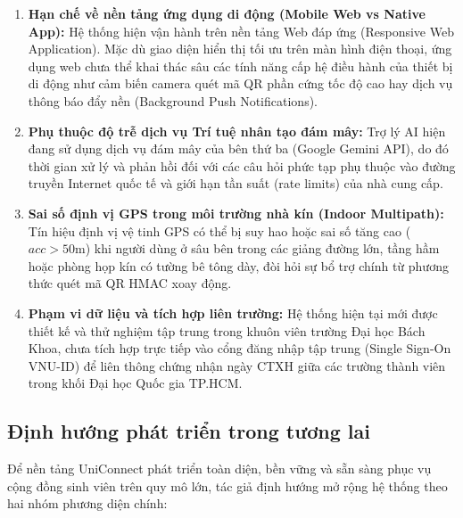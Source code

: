 \begin{enumerate}[leftmargin=*]
    \item \textbf{Hạn chế về nền tảng ứng dụng di động (Mobile Web vs Native App):} Hệ thống hiện vận hành trên nền tảng Web đáp ứng (Responsive Web Application). Mặc dù giao diện hiển thị tối ưu trên màn hình điện thoại, ứng dụng web chưa thể khai thác sâu các tính năng cấp hệ điều hành của thiết bị di động như cảm biến camera quét mã QR phần cứng tốc độ cao hay dịch vụ thông báo đẩy nền (Background Push Notifications).
    
    \item \textbf{Phụ thuộc độ trễ dịch vụ Trí tuệ nhân tạo đám mây:} Trợ lý AI hiện đang sử dụng dịch vụ đám mây của bên thứ ba (Google Gemini API), do đó thời gian xử lý và phản hồi đối với các câu hỏi phức tạp phụ thuộc vào đường truyền Internet quốc tế và giới hạn tần suất (rate limits) của nhà cung cấp.
    
    \item \textbf{Sai số định vị GPS trong môi trường nhà kín (Indoor Multipath):} Tín hiệu định vị vệ tinh GPS có thể bị suy hao hoặc sai số tăng cao ($acc > 50$m) khi người dùng ở sâu bên trong các giảng đường lớn, tầng hầm hoặc phòng họp kín có tường bê tông dày, đòi hỏi sự bổ trợ chính từ phương thức quét mã QR HMAC xoay động.
    
    \item \textbf{Phạm vi dữ liệu và tích hợp liên trường:} Hệ thống hiện tại mới được thiết kế và thử nghiệm tập trung trong khuôn viên trường Đại học Bách Khoa, chưa tích hợp trực tiếp vào cổng đăng nhập tập trung (Single Sign-On VNU-ID) để liên thông chứng nhận ngày CTXH giữa các trường thành viên trong khối Đại học Quốc gia TP.HCM.
\end{enumerate}

\subsection{Định hướng phát triển trong tương lai}
Để nền tảng UniConnect phát triển toàn diện, bền vững và sẵn sàng phục vụ cộng đồng sinh viên trên quy mô lớn, tác giả định hướng mở rộng hệ thống theo hai nhóm phương diện chính:

